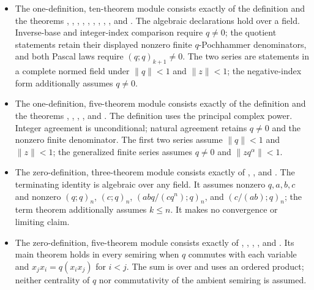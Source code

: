 \documentclass[11pt,a4paper,oneside,openany]{book}
\theoremstyle{definition}
\theoremstyle{remark}
\begin{document}
\begin{itemize}
\item The one-definition, ten-theorem module
 consists exactly of the definition
 and the theorems
,
,
,
,
,
,
,
,
, and
.  The algebraic
declarations hold over a field.  Inverse-base and integer-index comparison
require $q\ne0$; the quotient statements retain their displayed nonzero
finite \(q\)-Pochhammer denominators, and both Pascal laws require
$(q;q)_{k+1}\ne0$.  The two series are  statements in a complete
normed field under $\lVert q\rVert<1$ and $\lVert z\rVert<1$; the
negative-index form additionally assumes $q\ne0$.

\item The one-definition, five-theorem module
 consists exactly of the definition
 and the theorems
,
,
,
, and
.  The definition uses the principal
complex power.  Integer agreement is unconditional; natural agreement
retains $q\ne0$ and the nonzero finite denominator.  The first two series
assume $\lVert q\rVert<1$ and $\lVert z\rVert<1$; the generalized finite
series assumes $q\ne0$ and $\lVert zq^\alpha\rVert<1$.

\item The zero-definition, three-theorem module
 consists exactly of
,
, and
.  The terminating identity is algebraic
over any field.  It assumes nonzero $q,a,b,c$ and nonzero
$(q;q)_n$, $(c;q)_n$, $(abq/(cq^n);q)_n$, and $(c/(ab);q)_n$; the term
theorem additionally assumes $k\le n$.  It makes no convergence or limiting
claim.

\item The zero-definition, five-theorem module
 consists exactly of
,
,
,
, and
.  Its main theorem holds in every semiring
when $q$ commutes with each variable and $x_jx_i=q(x_ix_j)$ for $i<j$.
The sum is over  and uses an ordered
 product; neither centrality of $q$ nor commutativity of the
ambient semiring is assumed.


\end{itemize}
\end{document}
